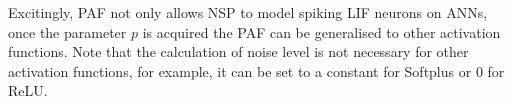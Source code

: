 \documentclass[10pt,journal,compsoc]{IEEEtran}
\begin{document}
	Excitingly, PAF not only allows NSP to model spiking LIF neurons on ANNs, once the parameter $p$ is acquired the PAF can be generalised to other activation functions.
	Note that the calculation of noise level is not necessary for other activation functions, for example, it can be set to a constant for Softplus or 0 for ReLU.
	
\end{document}
